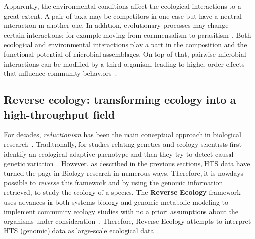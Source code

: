       Apparently, the environmental conditions affect the ecological interactions to a
      great extent. 
      A pair of taxa may be competitors in one case but have a neutral interaction in another one. 
      In addition, evolutionary processes may change certain interactions; 
      for example moving from commensalism to parasitism~\cite{parmentier2016commensalism}.
      Both ecological and environmental interactions 
      play a part in the composition and the functional potential of 
      microbial assemblages. 
      On top of that, pairwise microbial interactions can be modified by a third organism, 
      leading to higher-order effects that influence community behaviors~\cite{bairey2016high}. 
   \subsection{Reverse ecology: transforming ecology into a high-throughput field}
   \label{subsec:revec}

      For decades, \textit{reductionism} has been the main conceptual approach 
      in biological research~\cite{noble2008music}.
      Traditionally, for studies relating genetics and ecology
      scientists first identify an ecological adaptive phenotype 
      and then they try to detect causal genetic variation~\cite{noble2008music}.
      However, as described in the previous sections, HTS data have turned the page in 
      Biology research in numerous ways. 
      Therefore, it is nowdays possible to \textit{reverse} this framework and by 
      using the genomic information retrieved, to study 
      the ecology of a species.
      The \textbf{Reverse Ecology} framework uses advances 
      in both systems biology and genomic metabolic modeling to implement  
      community ecology studies 
      with no a priori assumptions about the organisms under consideration~\cite{cao2016revecor}.
      Therefore, Reverse Ecology 
      attempts to interpret HTS (genomic) data as large-scale ecological data~\cite{levy2012reverse}.

